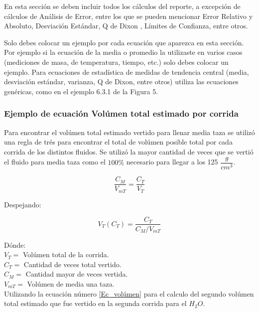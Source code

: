 \documentclass[osajnl,onecolumn,showpacs,superscriptaddress,12pt]{revtex4-1}
\begin{document}
En esta sección se deben incluir todos los cálculos del reporte, a excepción de cálculos de Análisis de Error, entre los que se pueden mencionar Error Relativo y Absoluto, Desviación Estándar, Q de Dixon , Límites de Confianza, entre otros.\

Solo debes colocar un ejemplo por cada ecuación que aparezca en esta sección. Por ejemplo si la ecuación de la media o promedio la utilizaste en varios casos (mediciones de masa, de temperatura, tiempo, etc.) solo debes colocar un ejemplo. Para ecuaciones de estadística de medidas de tendencia central (media, desviación estándar, varianza, Q de Dixon, entre otros) utiliza las ecuaciones genéricas, como en el ejemplo 6.3.1 de la Figura 5.




\subsubsection{Ejemplo de ecuación Volúmen total estimado por corrida}


Para encontrar el volúmen total estimado vertido para llenar media taza se utilizó una regla de trés para encontrar el total de volúmen posible total por cada corrida de los distintos fluidos. Se utilizó la mayor cantidad de veces que se vertió el fluido para media taza como el $100 \%$ necesario para llegar a los 125 $\dfrac{g}{cm^{3}}$.



\[\frac{C_{M}}{V_{mT}} =  \frac{C_{T}}{V_{T}} \]


Despejando:


\begin{equation}
V_{T} (C_{T}) = \dfrac{C_{T}}{C_{M}/V_{mT}}
\label{Ec_volúmen}
\end{equation}


Dónde:\\
$V_{T} =$ Volúmen total de la corrida.\\
$C_{T} =$ Cantidad de veces total vertido.\\
$C_{M} =$ Cantidad mayor de veces vertida.\\
$V_{mT} =$ Volúmen de media una taza.\\



Utilizando la ecuación número \ref{Ec_volúmen} para el calculo del segundo volúmen total estimado que fue vertido en la segunda corrida para el $H_{2}O$.
\end{document}
